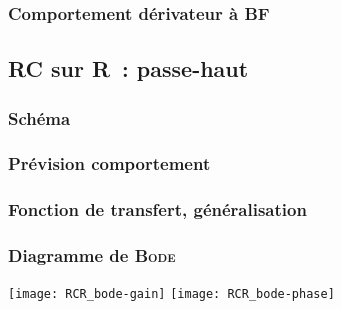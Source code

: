 \documentclass[../../main/main.tex]{subfiles}
\begin{document}
%
%

\subsubsection{Comportement dérivateur à BF}

\subsection{RC sur R~: passe-haut}
\subsubsection{Schéma}
\subsubsection{Prévision comportement}
\subsubsection{Fonction de transfert, généralisation}
\subsubsection{Diagramme de \textsc{Bode}}
\begin{center}
	\texttt{[image: RCR\_bode-gain]}
	\texttt{[image: RCR\_bode-phase]}
\end{center}
\end{document}
